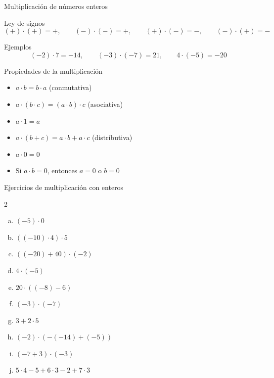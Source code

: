 \documentclass[aspectratio=169,10pt]{beamer}
\begin{document}
	\begin{frame}{Multiplicación de números enteros}
		\begin{block}{Ley de signos}
			\[
			(+)\cdot(+)=+,\qquad (-)\cdot(-)=+,\qquad (+)\cdot(-)=-,\qquad (-)\cdot(+)=-
			\]
		\end{block}
		
		\begin{exampleblock}{Ejemplos}
			\[
			(-2)\cdot 7=-14,\qquad (-3)\cdot(-7)=21,\qquad 4\cdot(-5)=-20
			\]
		\end{exampleblock}
	\end{frame}
	
	\begin{frame}{Propiedades de la multiplicación}
		\begin{itemize}[<+->]
			\item \(a\cdot b=b\cdot a\) \hfill (conmutativa)
			\item \(a\cdot(b\cdot c)=(a\cdot b)\cdot c\) \hfill (asociativa)
			\item \(a\cdot 1=a\)
			\item \(a\cdot(b+c)=a\cdot b+a\cdot c\) \hfill (distributiva)
			\item \(a\cdot 0=0\)
			\item Si \(a\cdot b=0\), entonces \(a=0\) o \(b=0\)
		\end{itemize}
	\end{frame}
	
	\begin{frame}{Ejercicios de multiplicación con enteros}
		\begin{multicols}{2}
			\begin{enumerate}[a)]
				\item \((-5)\cdot 0\)
				\item \(((-10)\cdot 4)\cdot 5\)
				\item \(((-20)+40)\cdot(-2)\)
				\item \(4\cdot(-5)\)
				\item \(20\cdot((-8)-6)\)
				\item \((-3)\cdot(-7)\)
				\item \(3+2\cdot 5\)
				\item \((-2)\cdot(-(-14)+(-5))\)
				\item \((-7+3)\cdot(-3)\)
				\item \(5\cdot4-5+6\cdot3-2+7\cdot3\)
			\end{enumerate}
		\end{multicols}
	\end{frame}
	
\end{document}
